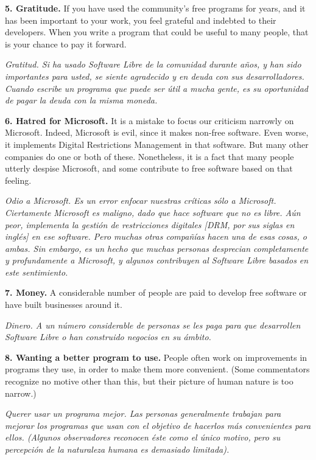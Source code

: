 {\bf 5. Gratitude.} If you have used the community's free programs for years, and it has been important to your work, you feel grateful and indebted to their developers. When you write a program that could be useful to many people, that is your chance to pay it forward.

\textit{Gratitud. Si ha usado \textit{Software Libre} de la comunidad durante años, y han sido importantes para usted, se siente agradecido y en deuda con sus desarrolladores. Cuando escribe un programa que puede ser útil a mucha gente, es su oportunidad de pagar la deuda con la misma moneda.}\vspace{0.4cm} 

{\bf 6. Hatred for Microsoft.}  It is a mistake to focus our criticism narrowly on Microsoft. Indeed, Microsoft is evil, since it makes non-free software. Even worse, it implements Digital Restrictions Management in that software. But many other companies do one or both of these. Nonetheless, it is a fact that many people utterly despise Microsoft, and some contribute to free software based on that feeling.

\textit{Odio a Microsoft. Es un error enfocar nuestras críticas sólo a Microsoft. Ciertamente Microsoft es maligno, dado que hace software que no es libre. Aún peor, implementa la gestión de restricciones digitales [DRM, por sus siglas en inglés] en ese software. Pero muchas otras compañías hacen una de esas cosas, o ambas. Sin embargo, es un hecho que muchas personas desprecian completamente y profundamente a Microsoft, y algunos contribuyen al \textit{Software Libre} basados en este sentimiento.}\vspace{0.4cm} 

{\bf 7. Money.} A considerable number of people are paid to develop free software or have built businesses around it.

\textit{Dinero. A un número considerable de personas se les paga para que desarrollen \textit{Software Libre} o han construido negocios en su ámbito.}\vspace{0.4cm} 

{\bf 8. Wanting a better program to use.} People often work on improvements in programs they use, in order to make them more convenient. (Some commentators recognize no motive other than this, but their picture of human nature is too narrow.)

\textit{Querer usar un programa mejor. Las personas generalmente trabajan para mejorar los programas que usan con el objetivo de hacerlos más convenientes para ellos. (Algunos observadores reconocen éste como el único motivo, pero su percepción de la naturaleza humana es demasiado limitada).}\vspace{0.4cm}


